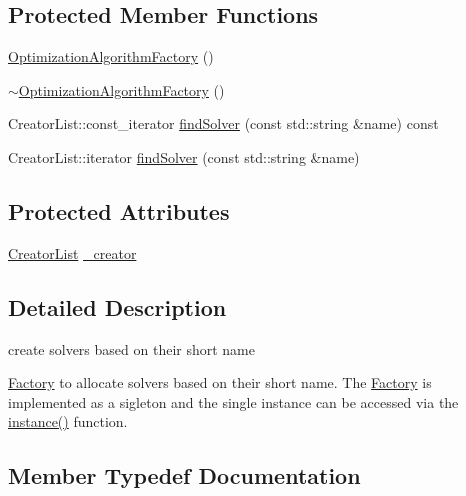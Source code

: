\subsection*{Protected Member Functions}
\begin{DoxyCompactItemize}
\item 
\mbox{\hyperlink{classg2o_1_1_optimization_algorithm_factory_ac0e56515170544768e4cad9f2fede55c}{Optimization\+Algorithm\+Factory}} ()
\item 
\mbox{\hyperlink{classg2o_1_1_optimization_algorithm_factory_a172879a5ecbbe9ec7c4771c87aef1c57}{$\sim$\+Optimization\+Algorithm\+Factory}} ()
\item 
Creator\+List\+::const\+\_\+iterator \mbox{\hyperlink{classg2o_1_1_optimization_algorithm_factory_a33368953cc13fc69bad64ce440d90a39}{find\+Solver}} (const std\+::string \&name) const
\item 
Creator\+List\+::iterator \mbox{\hyperlink{classg2o_1_1_optimization_algorithm_factory_a75857fd4977318d51412f4ebae20157d}{find\+Solver}} (const std\+::string \&name)
\end{DoxyCompactItemize}
\subsection*{Protected Attributes}
\begin{DoxyCompactItemize}
\item 
\mbox{\hyperlink{classg2o_1_1_optimization_algorithm_factory_a3ed210b94bf09b47e30d07da3766b4ec}{Creator\+List}} \mbox{\hyperlink{classg2o_1_1_optimization_algorithm_factory_a1d7f67d60df0d0b26a7694dcea4879db}{\+\_\+creator}}
\end{DoxyCompactItemize}


\subsection{Detailed Description}
create solvers based on their short name 

\mbox{\hyperlink{classg2o_1_1_factory}{Factory}} to allocate solvers based on their short name. The \mbox{\hyperlink{classg2o_1_1_factory}{Factory}} is implemented as a sigleton and the single instance can be accessed via the \mbox{\hyperlink{classg2o_1_1_optimization_algorithm_factory_a4fe827a82f01c74ef124e7a9a9c98707}{instance()}} function. 

\subsection{Member Typedef Documentation}
\mbox{\label{classg2o_1_1_optimization_algorithm_factory_a3ed210b94bf09b47e30d07da3766b4ec}} 
